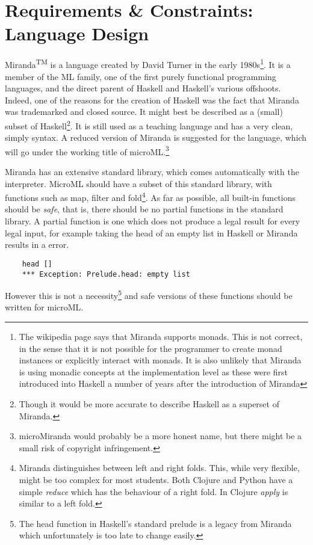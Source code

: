 \documentclass[11pt, a4paper]{article}
\begin{document}
\section{Requirements \& Constraints: Language Design}
Miranda\textsuperscript{TM} is a language created by David Turner in the early 1980s\footnote{The wikipedia 
    page says that Miranda supports monads. This is not correct, in
    the sense that it is not possible for the programmer to create monad instances or explicitly
    interact with monads. It is also
unlikely that Miranda is using monadic concepts at the implementation level as these were first
introduced into Haskell a number of years after the introduction of Miranda}. It is a member
of the ML family, one of the first purely functional programming languages, and the direct parent of
Haskell and Haskell's various offshoots. Indeed, one of the reasons for the creation of Haskell was
the fact that Miranda was trademarked and closed source. It might best be described as a (small)
subset of Haskell\footnote{Though it would be more accurate to describe Haskell as a superset of
    Miranda.}. It is still used as a teaching language and has a very clean, simply syntax. A
reduced version of Miranda is suggested for the language, which will go under the working title of
microML.\footnote{microMiranda would probably be a more honest name, but there might be a small
    risk of copyright infringement.}

Miranda has an extensive standard library, which comes automatically with the interpreter. MicroML
should have a subset of this standard library, with functions such as map, filter and fold\footnote{Miranda 
    distinguishes between left and right folds. This, while very flexible, might be
too complex for most students. Both Clojure and Python have a simple \textit{reduce} which has the
behaviour of a right fold. In Clojure \textit{apply} is similar to a left fold.}. As far as possible, 
all built-in functions should be \textit{safe}, that is, there should be no
partial functions in the standard library. A partial function is one which does not produce a legal
result for every legal input, for example taking the head of an empty list in Haskell or Miranda
results in a error.

\begin{verbatim}
    head []
    *** Exception: Prelude.head: empty list
\end{verbatim} 

However this is not a necessity\footnote{The head function in Haskell's standard prelude is a legacy
from Miranda which unfortunately is too late to change easily.} and safe versions of these functions
should be written for microML. 
\end{document}
